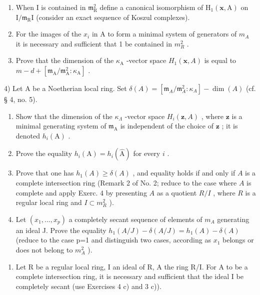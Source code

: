 \begin{enumerate}
\def\labelenumi{\alph{enumi})}
\item
  When I is contained in \(\mathfrak{m}_{\mathrm{R}}^{2}\) define a canonical isomorphism of \(\mathrm{H}_1(\mathbf{x},\mathrm{A})\) on \(\mathrm{I} / \mathfrak{m}_{\mathrm{R}}\mathrm{I}\) (consider an exact sequence of Koszul complexes).
\item
  For the images of the \(x_{i}\) in A to form a minimal system of generators of \(m_{A}\) it is necessary and sufficient that 1 be contained in \(m_{R}^{2}\) .
\item
  Prove that the dimension of the \(\kappa_{\mathrm{A}}\) -vector space \(H_1(\mathbf{x}, A)\) is equal to \(m - d + [\mathfrak{m}_{\mathrm{A}} / \mathfrak{m}_{\mathrm{A}}^{2} : \kappa_{\mathrm{A}}]\) .
\end{enumerate}

4) Let A be a Noetherian local ring. Set \(\delta(A) = [\mathfrak{m}_{A}/\mathfrak{m}_{A}^{2}:\kappa_{A}] - \dim(A)\) (cf. § 4, no. 5).

\begin{enumerate}
\def\labelenumi{\alph{enumi})}
\item
  Show that the dimension of the \(\kappa_{\Lambda}\) -vector space \(H_{i}(\mathbf{z}, A)\) , where \(\mathbf{z}\) is a minimal generating system of \(\mathfrak{m}_{\mathrm{A}}\) is independent of the choice of \(\mathbf{z}\) ; it is denoted \(h_{i}(\mathrm{A})\) .
\item
  Prove the equality \(h_i(\mathrm{A}) = h_i(\widehat{\mathrm{A}})\) for every \(i\) .
\item
  Prove that one has \(h_1(A) \geqslant \delta(A)\) , and equality holds if and only if \(A\) is a complete intersection ring (Remark 2 of No. 2; reduce to the case where \(A\) is complete and apply Exerc. 4 by presenting \(A\) as a quotient \(R/I\) , where \(R\) is a regular local ring and \(I \subset m_R^2\) ).
\item
  Let \((x_{1},\ldots,x_{p})\) a completely secant sequence of elements of \(m_{A}\) generating an ideal J. Prove the equality \(h_{1}(A/J)-\delta(A/J)=h_{1}(A)-\delta(A)\) (reduce to the case p=1 and distinguish two cases, according as \(x_{1}\) belongs or does not belong to \(m_{A}^{2}\) ).
\end{enumerate}

\begin{enumerate}
\def\labelenumi{\arabic{enumi})}
\setcounter{enumi}{4}
\tightlist
\item
  Let R be a regular local ring, I an ideal of R, A the ring R/I. For A to be a complete intersection ring, it is necessary and sufficient that the ideal I be completely secant (use Exercises 4 c) and 3 c)).
\end{enumerate}

